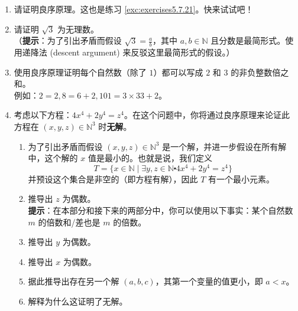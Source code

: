 \begin{enumerate}[label=(\arabic*)]
    \item 请证明良序原理。这也是练习 \ref{exc:exercises5.7.21}。快来试试吧！
    \item 请证明 $\sqrt{3}$ 为无理数。\\
        （\textbf{提示}：为了引出矛盾而假设 $\sqrt{3} = \frac{a}{b}$，其中 $a, b \in \mathbb{N}$ 且分数是最简形式。使用递降法 (descent argument) 来反驳这里最简形式的假设。）
    \item 使用良序原理证明每个自然数（除了 $1$）都可以写成 $2$ 和 $3$ 的非负整数倍之和。\\
        例如：$2 = 2, 8 = 6 + 2, 101 = 3 \times 33 + 2$。
    \item 考虑以下方程：$4x^4 + 2y^4 = z^4$。在这个问题中，你将通过良序原理来论证此方程在 $(x, y, z) \in \mathbb{N}^3$ 时\textbf{无解}。
        \begin{enumerate}[label=(\alph*)]
            \item 为了引出矛盾而假设 $(x, y, z) \in \mathbb{N}^3$ 是一个解，并进一步假设在所有解中，这个解的 $x$ 值是最小的。也就是说，我们定义
            \[T = \{x \in \mathbb{N} \mid \exists y, z \in \mathbb{N} \centerdot 4x^4 + 2y^4 = z^4\}\]
            并预设这个集合是非空的（即方程有解），因此 $T$ 有一个最小元素。
            \item 推导出 $z$ 为偶数。\\
            \textbf{提示}：在本部分和接下来的两部分中，你可以使用以下事实：某个自然数 $m$ 的倍数和/差也是 $m$ 的倍数。
            \item 推导出 $y$ 为偶数。
            \item 推导出 $x$ 为偶数。
            \item 据此推导出存在另一个解 $(a, b, c)$，其第一个变量的值更小，即 $a < x$。
            \item 解释为什么这证明了无解。
        \end{enumerate}
\end{enumerate}
